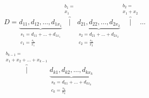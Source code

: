 \documentclass[conference]{IEEEtran}
\begin{document}
\begin{equation}\begin{aligned}
D=
\underbrace{d_{11}, d_{12}, \dots, d_{1x_1}}_{\substack{s_1 = d_{11} + \dots + d_{1x_1} \\  c_1 = \frac{s_1}{x_1}}}
\overbrace{|}^{\substack{b_1 = \\ x_1}}
\underbrace{d_{21}, d_{22}, \dots, d_{2x_2}}_{\substack{s_2 = d_{21} + \dots + d_{2x_2} \\  c_2 = \frac{s_2}{x_2}}}
\overbrace{|}^{\substack{b_2 = \\ x_1 + x_2}}
\dots \\
\overbrace{|}^{\substack{b_{k-1} = \\ x_1 + x_2 + \dots + x_{k-1}}}
\underbrace{d_{k1}, d_{k2}, \dots, d_{kx_k}}_{\substack{s_k = d_{k1} + \dots + d_{kx_k} \\  c_k = \frac{s_k}{x_k}}}
\end{aligned}
\end{equation}
\end{document}
